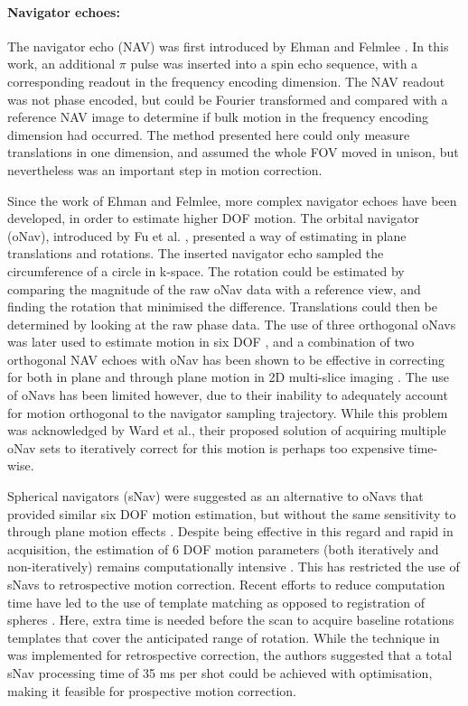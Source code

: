 \documentclass[class=article, crop=false]{standalone}
\begin{document}
\paragraph{Navigator echoes:}
The navigator echo (NAV) was first introduced by Ehman and Felmlee \parencite*{Ehman1989}. In this work, an additional $\pi$ pulse was inserted into a spin echo sequence, with a corresponding readout in the frequency encoding dimension. The NAV readout was not phase encoded, but could be Fourier transformed and compared with a reference NAV image to determine if bulk motion in the frequency encoding dimension had occurred. The method presented here could only measure translations in one dimension, and assumed the whole FOV moved in unison, but nevertheless was an important step in motion correction.
\par
Since the work of Ehman and Felmlee, more complex navigator echoes have been developed, in order to estimate higher DOF motion. The orbital navigator (oNav), introduced by Fu et al. \parencite*{ZhuoWuFu1995}, presented a way of estimating in plane translations and rotations. The inserted navigator echo sampled the circumference of a circle in k-space. The rotation could be estimated by comparing the magnitude of the raw oNav data with a reference view, and finding the rotation that minimised the difference. Translations could then be determined by looking at the raw phase data. The use of three orthogonal oNavs was later used to estimate motion in six DOF \parencite{Ward2000}, and a combination of two orthogonal NAV echoes with oNav has been shown to be effective in correcting for both in plane and through plane motion in 2D multi-slice imaging \parencite{Lin2014}. The use of oNavs has been limited however, due to their inability to adequately account for motion orthogonal to the navigator sampling trajectory. While this problem was acknowledged by Ward et al., their proposed solution of acquiring multiple oNav sets to iteratively correct for this motion is perhaps too expensive time-wise.
\par
Spherical navigators (sNav) were suggested as an alternative to oNavs that provided similar six DOF motion estimation, but without the same sensitivity to through plane motion effects \parencite{Welch2001,Petrie2005}. Despite being effective in this regard and rapid in acquisition, the estimation of 6 DOF motion parameters (both iteratively and non-iteratively) remains computationally intensive \parencite{Welch2004,Costa2010,Costa2005}. This has restricted the use of sNavs to retrospective motion correction. Recent efforts to reduce computation time have led to the use of template matching as opposed to registration of spheres \parencite{Liu2011,Johnson2016}. Here, extra time is needed before the scan to acquire baseline rotations templates that cover the anticipated range of rotation. While the technique in \cite{Johnson2016} was implemented for retrospective correction, the authors suggested that a total sNav processing time of 35 ms per shot could be achieved with optimisation, making it feasible for prospective motion correction.
\end{document}
